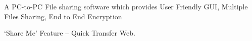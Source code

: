 \documentclass[]{hieudo-build}
\begin{document}
\begin{minipage}[t]{0.60\textwidth}

\begin{tightemize}
\item A PC-to-PC File sharing software which provides User Friendly GUI, Multiple Files Sharing, End to End Encryption
\item ‘Share Me’ Feature – Quick Transfer Web.
\end{tightemize}


\end{minipage}
\end{document}
